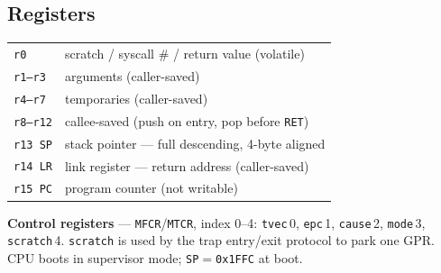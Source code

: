 \documentclass[9pt]{extarticle}
\newcommand{\code}[1]{\texttt{#1}}
\begin{document}
\begin{multicols}{2}
\section{Registers}
\begin{tabular}{@{}L{1.5cm} L{5.2cm}@{}}
\code{r0}      & scratch / syscall \# / return value (volatile) \\
\code{r1--r3}  & arguments (caller-saved) \\
\code{r4--r7}  & temporaries (caller-saved) \\
\code{r8--r12} & callee-saved (push on entry, pop before \code{RET}) \\
\code{r13 SP}  & stack pointer --- full descending, 4-byte aligned \\
\code{r14 LR}  & link register --- return address (caller-saved) \\
\code{r15 PC}  & program counter (not writable) \\
\end{tabular}
\par\vspace{0.3em}\noindent
{\footnotesize\textbf{Control registers} --- \code{MFCR}/\code{MTCR}, index 0--4:
\code{tvec}\,0, \code{epc}\,1, \code{cause}\,2, \code{mode}\,3, \code{scratch}\,4.
\code{scratch} is used by the trap entry/exit protocol to park one GPR.
CPU boots in supervisor mode; \code{SP}${=}$\code{0x1FFC} at boot.}


\end{multicols}
\end{document}
